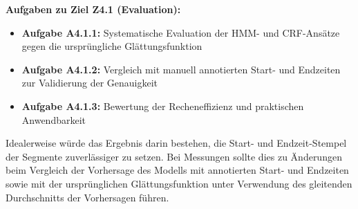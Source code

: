 \textbf{Aufgaben zu Ziel Z4.1 (Evaluation):}
\begin{itemize}
\item \textbf{Aufgabe A4.1.1:} Systematische Evaluation der HMM- und CRF-Ansätze gegen die ursprüngliche Glättungsfunktion
\item \textbf{Aufgabe A4.1.2:} Vergleich mit manuell annotierten Start- und Endzeiten zur Validierung der Genauigkeit
\item \textbf{Aufgabe A4.1.3:} Bewertung der Recheneffizienz und praktischen Anwendbarkeit
\end{itemize}

Idealerweise würde das Ergebnis darin bestehen, die Start- und Endzeit-Stempel der Segmente zuverlässiger zu setzen. Bei Messungen sollte dies zu Änderungen beim Vergleich der Vorhersage des Modells mit annotierten Start- und Endzeiten sowie mit der ursprünglichen Glättungsfunktion unter Verwendung des gleitenden Durchschnitts der Vorhersagen führen.
